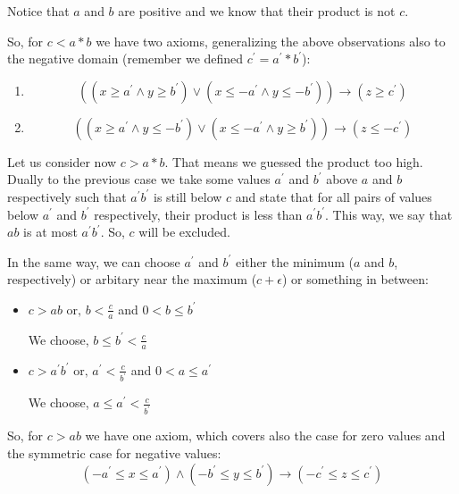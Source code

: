 \noindent  Notice that $a$ and $b$ are positive and we know that their product is not $c$.\newline

\noindent  So, for $c < a \ast b$ we have two axioms, generalizing the above observations also to the negative domain (remember we defined $c^\prime = a^\prime \ast b^\prime$):

\begin{enumerate}
    \item $$((x \geq a^\prime \wedge y \geq b^\prime) \vee (x \leq -a^\prime \wedge y \leq -b^\prime)) \to (z \geq c^\prime)$$
    \item $$((x \geq a^\prime \wedge y \leq -b^\prime) \vee (x \leq -a^\prime \wedge y \geq b^\prime)) \to (z \leq -c^\prime)$$
\end{enumerate}

\noindent  Let us consider now $c > a \ast b$.
That means we guessed the product too high.
Dually to the previous case we take some values $a^\prime$ and $b^\prime$ above $a$ and $b$ respectively such that $a^\prime b^\prime$ is still below $c$ and state that for all pairs of values below $a^\prime$ and $b^\prime$ respectively, their product is less than $a^\prime b^\prime$.
This way, we say that $ab$ is at most $a^\prime b^\prime$.
So, $c$ will be excluded.\newline

\noindent In the same way, we can choose $a^\prime$ and $b^\prime$ either the minimum ($a$ and $b$, respectively) or arbitary near the maximum ($c + \epsilon$) or something in between:
\begin{itemize}
    \item $c > ab \text{ or, } b < \frac{c}{a}$ and $0 < b \leq b^\prime$\newline
    
    We choose, $b \leq b^\prime < \frac{c}{a}$
     \item $c > a^\prime b^\prime \text{ or, } a^\prime < \frac{c}{b^\prime}$ and $0 < a \leq a^\prime$\newline
     
     We choose, $a \leq a^\prime < \frac{c}{b^\prime}$
\end{itemize}

\noindent  So, for $c > ab$ we have one axiom, which covers also the case for zero values and the symmetric case for negative values:
$$(-a^\prime \leq x \leq a^\prime) \wedge (-b^\prime \leq y \leq b^\prime) \to (-c^\prime \leq z \leq c^\prime)$$


